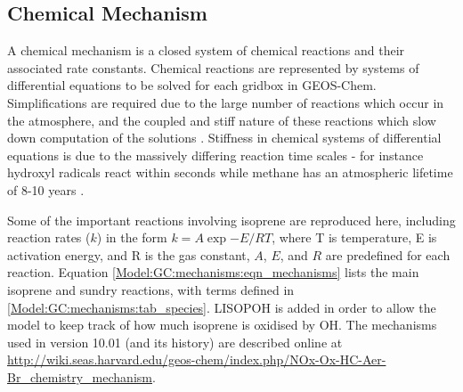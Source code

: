   \subsection{Chemical Mechanism}
    \label{Model:GC:mechanisms}
    A chemical mechanism is a closed system of chemical reactions and their associated rate constants.
    Chemical reactions are represented by systems of differential equations to be solved for each gridbox in GEOS-Chem.
    Simplifications are required due to the large number of reactions which occur in the atmosphere, and the coupled and stiff nature of these reactions which slow down computation of the solutions \parencite{BrasseurJacob2017}.
    Stiffness in chemical systems of differential equations is due to the massively differing reaction time scales - for instance hydroxyl radicals react within seconds while methane has an atmospheric lifetime of 8-10 years \parencite{Wuebbles2002}. 
    
    Some of the important reactions involving isoprene are reproduced here, including reaction rates ($k$) in the form $ k = A \exp{-E/RT}$, where T is temperature, E is activation energy, and R is the gas constant, $A$, $E$, and $R$ are predefined for each reaction.
    Equation \ref{Model:GC:mechanisms:eqn_mechanisms} lists the main isoprene and sundry reactions, with terms defined in \ref{Model:GC:mechanisms:tab_species}.
    LISOPOH is added in order to allow the model to keep track of how much isoprene is oxidised by OH.
    The mechanisms used in version 10.01 (and its history) are described online at \url{http://wiki.seas.harvard.edu/geos-chem/index.php/NOx-Ox-HC-Aer-Br_chemistry_mechanism}.
    
    
